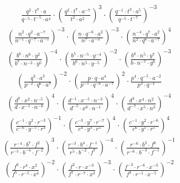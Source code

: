 \begin{align}
\frac{q^{2}\cdot t^{7}\cdot a}{q^{-5}\cdot t^{-5}\cdot a^{4}}\cdot \left(\frac{q^{2}\cdot t^{7}\cdot a^{-7}}{t^{2}\cdot a^{2}}\right)^{3}\cdot \left(\frac{q^{-1}\cdot t^{3}\cdot a^{5}}{q^{-5}\cdot t^{-7}}\right)^{-3}
\end{align}
\begin{align}
\left(\frac{n^{2}\cdot q^{2}\cdot a^{-7}}{n^{-1}\cdot q^{-7}\cdot a^{-5}}\right)^{-3}\cdot \left(\frac{n\cdot q^{-6}\cdot a^{2}}{n^{7}\cdot a^{-3}}\right)^{-3}\cdot \left(\frac{n^{-4}\cdot q^{7}\cdot a^{2}}{n^{2}\cdot q^{6}\cdot a^{-7}}\right)^{4}
\end{align}
\begin{align}
\left(\frac{b^{6}\cdot n^{6}\cdot y^{2}}{b^{7}\cdot n^{-3}\cdot y^{5}}\right)^{-4}\cdot \left(\frac{b^{5}\cdot n^{-5}\cdot y^{-4}}{b^{6}\cdot n^{5}\cdot y^{-5}}\right)^{-2}\cdot \left(\frac{b^{6}\cdot n^{5}\cdot y^{7}}{b\cdot n^{-7}\cdot y^{6}}\right)^{-3}
\end{align}
\begin{align}
\left(\frac{q^{3}\cdot a^{3}}{p^{-2}\cdot q^{6}\cdot a^{7}}\right)^{-2}\cdot \left(\frac{p\cdot q\cdot a^{4}}{p^{-5}\cdot q^{-6}\cdot a^{-7}}\right)^{2}\cdot \frac{p^{4}\cdot q^{-5}\cdot a^{-2}}{p^{3}\cdot q^{-4}}
\end{align}
\begin{align}
\left(\frac{d^{7}\cdot x^{2}\cdot n^{-5}}{d\cdot x^{-1}\cdot n^{-6}}\right)^{4}\cdot \left(\frac{d^{-1}\cdot x^{-5}\cdot n^{-3}}{d^{-5}\cdot x^{6}\cdot n^{-1}}\right)^{4}\cdot \left(\frac{d^{3}\cdot x^{4}\cdot n^{2}}{d^{-7}\cdot x^{5}\cdot n^{3}}\right)^{-4}
\end{align}
\begin{align}
\left(\frac{c^{-1}\cdot y^{2}\cdot r^{-3}}{c^{-6}\cdot y^{-5}\cdot r^{3}}\right)^{-1}\cdot \left(\frac{c^{-3}\cdot y^{7}\cdot r^{-7}}{c^{4}\cdot y^{3}\cdot r^{5}}\right)^{4}\cdot \left(\frac{c^{-1}\cdot y^{2}\cdot r^{-6}}{c^{6}\cdot y^{5}\cdot r^{5}}\right)^{4}
\end{align}
\begin{align}
\left(\frac{r^{-4}\cdot b^{7}\cdot f^{2}}{r^{-5}\cdot b^{-4}\cdot f^{-2}}\right)^{3}\cdot \left(\frac{r^{-3}\cdot b^{4}\cdot f^{-1}}{r^{5}\cdot b^{-2}\cdot f^{7}}\right)^{-4}\cdot \left(\frac{r^{-6}\cdot b^{3}\cdot f^{6}}{r^{-6}\cdot b^{-3}\cdot f^{-1}}\right)^{-1}
\end{align}
\begin{align}
\left(\frac{f^{6}\cdot r^{4}\cdot x^{2}}{f^{5}\cdot r^{-5}\cdot x^{4}}\right)^{-2}\cdot \left(\frac{f^{2}\cdot r\cdot x^{-3}}{f^{7}\cdot r^{-7}\cdot x^{3}}\right)^{-3}\cdot \left(\frac{f^{-3}\cdot r^{-6}\cdot x^{-3}}{f^{3}\cdot r^{-1}\cdot x^{-5}}\right)^{-2}
\end{align}
